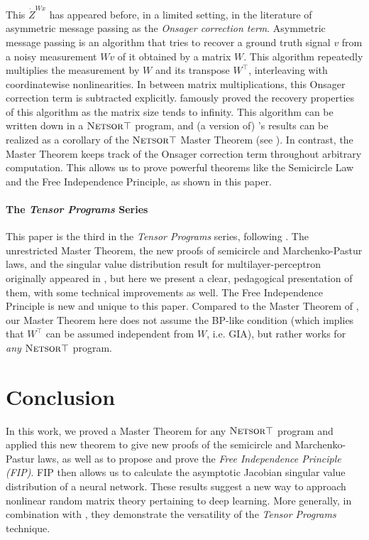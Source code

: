 \documentclass{article}
\newcommand{\Zdot}{\dot Z}
\theoremstyle{definition}
\theoremstyle{remark}
\newcommand{\trsp}{\top}
\newcommand{\netsort}{\texorpdfstring{{$\textsc{Netsor}\trsp$}}{NetsorT}}
\begin{document}
This $\Zdot^{Wx}$ has appeared before, in a limited setting, in the literature of asymmetric message passing as the \emph{Onsager correction term}. Asymmetric message passing \citep{donoho_message_2009} is an algorithm that tries to recover a ground truth signal $v$ from a noisy measurement $Wv$ of it obtained by a matrix $W$. This algorithm repeatedly multiplies the measurement by $W$ and its transpose $W^{\trsp}$, interleaving with coordinatewise nonlinearities. In between matrix multiplications, this Onsager correction term is subtracted explicitly. \citet{bayati_dynamics_2011} famously proved the recovery properties of this algorithm as the matrix size tends to infinity. This algorithm can be written down in a \netsort{} program, and (a version of) \citet{bayati_dynamics_2011}'s results can be realized as a corollary of the \netsort{} Master Theorem (see \citet{yangScalingLimitsWide2019arXiv.org}). In contrast, the Master Theorem keeps track of the Onsager correction term throughout arbitrary computation. This allows us to prove powerful theorems like the Semicircle Law and the Free Independence Principle, as shown in this paper.

\paragraph*{The \emph{Tensor Programs} Series}

This paper is the third in the \emph{Tensor Programs} series, following \citet{yangTP1,yangTP2}. The unrestricted Master Theorem, the new proofs of semicircle and Marchenko-Pastur laws, and the singular value distribution result for multilayer-perceptron originally appeared in \citet{yangScalingLimitsWide2019arXiv.org}, but here we present a clear, pedagogical presentation of them, with some technical improvements as well.
The Free Independence Principle is new and unique to this paper. Compared to the Master Theorem of \citet{yangTP2}, our Master Theorem here does not assume the BP-like condition (which implies that $W^\trsp$ can be assumed independent from $W$, i.e. GIA), but rather works for \emph{any} \netsort{} program.

\section{Conclusion}

In this work, we proved a Master Theorem for any \netsort{} program and applied this new theorem to give new proofs of the semicircle and Marchenko-Pastur laws, as well as to propose and prove the \emph{Free Independence Principle (FIP)}.
FIP then allows us to calculate the asymptotic Jacobian singular value distribution of a neural network.
These results suggest a new way to approach nonlinear random matrix theory pertaining to deep learning.
More generally, in combination with \citet{yangTP1,yangTP2}, they demonstrate the versatility of the \emph{Tensor Programs} technique.
\end{document}
